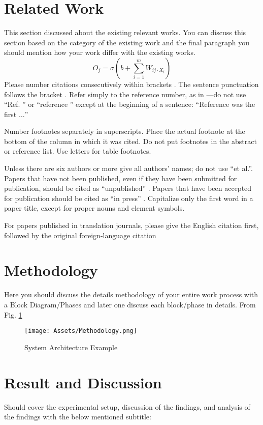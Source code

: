 \documentclass[conference]{IEEEtran}
\begin{document}
\section{Related Work}
This section discussed about the existing relevant works. You can discuss this section based on the category of the existing work and the final paragraph you should mention how your work differ with the existing works.
\begin{equation}
        O_{j}=\sigma(b+\sum_{i=1}^mW_{ij\cdot X_{i}}) \label{eq:ann}
    \end{equation}
Please number citations consecutively within brackets \cite{b1}. The 
sentence punctuation follows the bracket \cite{b2}. Refer simply to the reference 
number, as in \cite{b3}---do not use ``Ref. \cite{b3}'' or ``reference \cite{b3}'' except at 
the beginning of a sentence: ``Reference \cite{b3} was the first $\ldots$''

Number footnotes separately in superscripts. Place the actual footnote at 
the bottom of the column in which it was cited. Do not put footnotes in the 
abstract or reference list. Use letters for table footnotes.

Unless there are six authors or more give all authors' names; do not use 
``et al.''. Papers that have not been published, even if they have been 
submitted for publication, should be cited as ``unpublished'' \cite{b4}. Papers 
that have been accepted for publication should be cited as ``in press'' \cite{b5}. 
Capitalize only the first word in a paper title, except for proper nouns and 
element symbols.

For papers published in translation journals, please give the English 
citation first, followed by the original foreign-language citation \cite{b6}
\section{Methodology}
Here you should discuss the details methodology of your entire work process with a Block Diagram/Phases and later one discuss each block/phase in details. From Fig. \ref{fig:methodoclogy}
\begin{figure}[htbp]
\centerline{\texttt{[image: Assets/Methodology.png]}}
\caption{System Architecture Example}
\label{fig:methodoclogy}
\end{figure}
\section{Result and Discussion}
Should cover the experimental setup, discussion of the findings, and analysis of the findings with the below mentioned subtitle:
\end{document}
